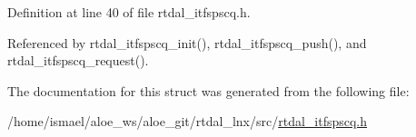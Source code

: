Definition at line 40 of file rtdal\-\_\-itfspscq.\-h.



Referenced by rtdal\-\_\-itfspscq\-\_\-init(), rtdal\-\_\-itfspscq\-\_\-push(), and rtdal\-\_\-itfspscq\-\_\-request().



The documentation for this struct was generated from the following file\-:\begin{DoxyCompactItemize}
\item 
/home/ismael/aloe\-\_\-ws/aloe\-\_\-git/rtdal\-\_\-lnx/src/\hyperlink{rtdal__itfspscq_8h}{rtdal\-\_\-itfspscq.\-h}\end{DoxyCompactItemize}
